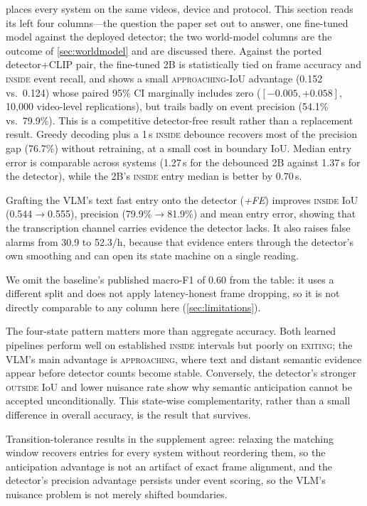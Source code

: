 \documentclass[10pt,twocolumn,letterpaper]{article}
\begin{document}
 places every system on the same videos, device and protocol.  This section reads its left four columns---the question the paper set out to answer, one fine-tuned model against the deployed detector; the two world-model columns are the outcome of \cref{sec:worldmodel} and are discussed there.  Against the ported detector+CLIP pair, the fine-tuned 2B is statistically tied on frame accuracy and \textsc{inside} event recall, and shows a small \textsc{approaching}-IoU advantage (0.152 vs.\ 0.124) whose paired 95\% CI marginally includes zero ($[-0.005,+0.058]$, 10{,}000 video-level replications), but trails badly on event precision (54.1\% vs.\ 79.9\%).  This is a competitive detector-free result rather than a replacement result.  Greedy decoding plus a 1\,s \textsc{inside} debounce recovers most of the precision gap (76.7\%) without retraining, at a small cost in boundary IoU.  Median entry error is comparable across systems (1.27\,s for the debounced 2B against 1.37\,s for the detector), while the 2B's \textsc{inside} entry median is better by 0.70\,s.

Grafting the VLM's text fast entry onto the detector (\emph{{+}FE}) improves \textsc{inside} IoU (0.544$\to$0.555), precision (79.9\%$\to$81.9\%) and mean entry error, showing that the transcription channel carries evidence the detector lacks.  It also raises false alarms from 30.9 to 52.3/h, because that evidence enters through the detector's own smoothing and can open its state machine on a single reading.

We omit the baseline's published macro-F1 of 0.60 from the table: it uses a different split and does not apply latency-honest frame dropping, so it is not directly comparable to any column here (\cref{sec:limitations}).

The four-state pattern matters more than aggregate accuracy.  Both learned pipelines perform well on established \textsc{inside} intervals but poorly on \textsc{exiting}; the VLM's main advantage is \textsc{approaching}, where text and distant semantic evidence appear before detector counts become stable.  Conversely, the detector's stronger \textsc{outside} IoU and lower nuisance rate show why semantic anticipation cannot be accepted unconditionally.  This state-wise complementarity, rather than a small difference in overall accuracy, is the result that survives.

Transition-tolerance results in the supplement agree: relaxing the matching window recovers entries for every system without reordering them, so the anticipation advantage is not an artifact of exact frame alignment, and the detector's precision advantage persists under event scoring, so the VLM's nuisance problem is not merely shifted boundaries.
\end{document}
